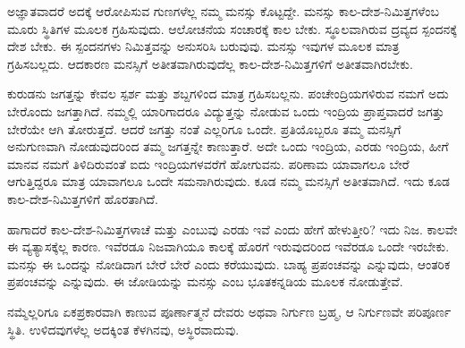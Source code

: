  ಅಜ್ಞಾತವಾದರೆ ಅದಕ್ಕೆ ಆರೋಪಿಸುವ ಗುಣಗಳೆಲ್ಲ ನಮ್ಮ ಮನಸ್ಸು ಕೊಟ್ಟದ್ದೇ. ಮನಸ್ಸು ಕಾಲ-ದೇಶ-ನಿಮಿತ್ತಗಳೆಂಬ ಮೂರು ಸ್ಥಿತಿಗಳ ಮೂಲಕ ಗ್ರಹಿಸುವುದು. ಆಲೋಚನೆಯ ಸಂಚಾರಕ್ಕೆ ಕಾಲ ಬೇಕು. ಸ್ಥೂಲವಾಗಿರುವ ದ್ರವ್ಯದ ಸ್ಪಂದನಕ್ಕೆ ದೇಶ ಬೇಕು. ಈ ಸ್ಪಂದನಗಳು ನಿಮಿತ್ತವನ್ನು ಅನುಸರಿಸಿ ಬರುವುವು. ಮನಸ್ಸು ಇವುಗಳ ಮೂಲಕ ಮಾತ್ರ ಗ್ರಹಿಸಬಲ್ಲದು. ಆದಕಾರಣ ಮನಸ್ಸಿಗೆ ಅತೀತವಾಗಿರುವುದೆಲ್ಲ ಕಾಲ-ದೇಶ-ನಿಮಿತ್ತಗಳಿಗೆ ಅತೀತವಾಗಿರಬೇಕು.

ಕುರುಡನು ಜಗತ್ತನ್ನು ಕೇವಲ ಸ್ಪರ್ಶ ಮತ್ತು ಶಬ್ದಗಳಿಂದ ಮಾತ್ರ ಗ್ರಹಿಸಬಲ್ಲನು. ಪಂಚೇಂದ್ರಿಯಗಳಿರುವ ನಮಗೆ ಅದು ಬೇರೊಂದು ಜಗತ್ತಾಗಿದೆ. ನಮ್ಮಲ್ಲಿ ಯಾರಿಗಾದರೂ ವಿದ್ಯುತ್ತನ್ನು ನೋಡುವ ಒಂದು ಇಂದ್ರಿಯ ಪ್ರಾಪ್ತವಾದರೆ ಜಗತ್ತು ಬೇರೆಯೇ ಆಗಿ ತೋರುತ್ತದೆ. ಆದರೆ ಜಗತ್ತು  ನಂತೆ ಎಲ್ಲರಿಗೂ ಒಂದೇ. ಪ್ರತಿಯೊಬ್ಬರೂ ತಮ್ಮ ಮನಸ್ಸಿಗೆ ಅನುಗುಣವಾಗಿ ನೋಡುವುದರಿಂದ ತಮ್ಮ ಜಗತ್ತನ್ನೇ ಕಾಣುತ್ತಾರೆ. ಅದೇ  ಒಂದು ಇಂದ್ರಿಯ,  ಎರಡು ಇಂದ್ರಿಯ, ಹೀಗೆ ಮಾನವ ನಮಗೆ ತಿಳಿದಿರುವಂತೆ ಐದು ಇಂದ್ರಿಯಗಳವರೆಗೆ ಹೋಗುವನು. ಪರಿಣಾಮ ಯಾವಾಗಲೂ ಬೇರೆ ಆಗುತ್ತಿದ್ದರೂ  ಮಾತ್ರ ಯಾವಾಗಲೂ ಒಂದೇ ಸಮನಾಗಿರುವುದು.  ಕೂಡ ನಮ್ಮ ಮನಸ್ಸಿಗೆ ಅತೀತವಾಗಿದೆ. ಇದು ಕೂಡ ಕಾಲ-ದೇಶ-ನಿಮಿತ್ತಗಳಿಗೆ ಹೊರತಾಗಿದೆ.

ಹಾಗಾದರೆ ಕಾಲ-ದೇಶ-ನಿಮಿತ್ತಗಳಾಚೆ  ಮತ್ತು  ಎಂಬುವು ಎರಡು ಇವೆ ಎಂದು ಹೇಗೆ ಹೇಳುತ್ತೀರಿ? ಇದು ನಿಜ. ಕಾಲವೇ ಈ ವ್ಯತ್ಯಾಸಕ್ಕೆಲ್ಲ ಕಾರಣ. ಇವೆರಡೂ ನಿಜವಾಗಿಯೂ ಕಾಲಕ್ಕೆ ಹೊರಗೆ ಇರುವುದರಿಂದ ಇವೆರಡೂ ಒಂದೇ ಇರಬೇಕು. ಮನಸ್ಸು ಈ ಒಂದನ್ನು ನೋಡಿದಾಗ ಬೇರೆ ಬೇರೆ ಎಂದು ಕರೆಯುವುದು. ಬಾಹ್ಯ ಪ್ರಪಂಚವನ್ನು  ಎನ್ನುವುದು, ಆಂತರಿಕ ಪ್ರಪಂಚವನ್ನು  ಎನ್ನುವುದು. ಈ ಜೋಡಿಯನ್ನು ಮನಸ್ಸು ಎಂಬ ಭೂತಕನ್ನಡಿಯ ಮೂಲಕ ನೋಡುತ್ತೇವೆ.

ನಮ್ಮೆಲ್ಲರಿಗೂ ಏಕಪ್ರಕಾರವಾಗಿ ಕಾಣುವ ಪೂರ್ಣಾತ್ಮನೆ ದೇವರು ಅಥವಾ ನಿರ್ಗುಣ ಬ್ರಹ್ಮ, ಆ ನಿರ್ಗುಣವೇ ಪರಿಪೂರ್ಣ ಸ್ಥಿತಿ. ಉಳಿದವುಗಳೆಲ್ಲ ಅದಕ್ಕಿಂತ ಕೆಳಗಿನವು, ಅಸ್ಥಿರವಾದುವು.

